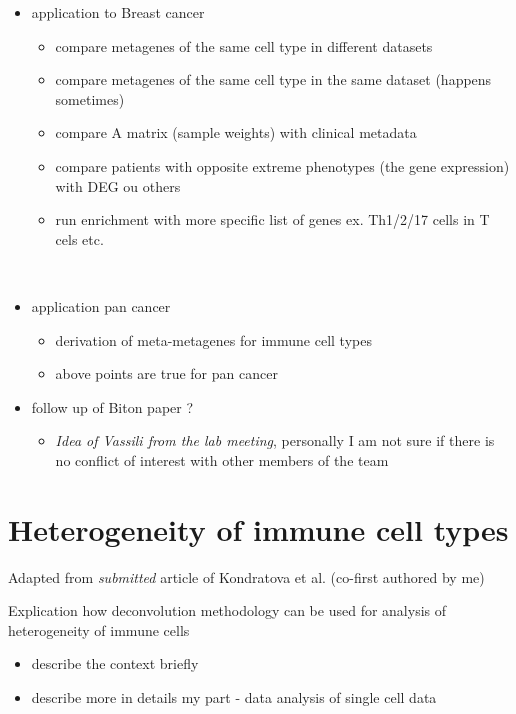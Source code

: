 \documentclass[12pt,]{book}
\providecommand{\tightlist}{%
  \setlength{\itemsep}{0pt}\setlength{\parskip}{0pt}}
\theoremstyle{definition}
\theoremstyle{definition}
\theoremstyle{definition}
\theoremstyle{remark}
\begin{document}
\begin{itemize}
\item
  application to Breast cancer

  \begin{itemize}
  \item
    compare metagenes of the same cell type in different datasets
  \item
    compare metagenes of the same cell type in the same dataset (happens
    sometimes)
  \item
    compare A matrix (sample weights) with clinical metadata
  \item
    compare patients with opposite extreme phenotypes (the gene
    expression) with DEG ou others
  \item
    run enrichment with more specific list of genes ex. Th1/2/17 cells
    in T cels etc.

    ​
  \end{itemize}
\item
  application pan cancer

  \begin{itemize}
  \tightlist
  \item
    derivation of meta-metagenes for immune cell types
  \item
    above points are true for pan cancer
  \end{itemize}
\item
  follow up of Biton paper ?

  \begin{itemize}
  \tightlist
  \item
    \emph{Idea of Vassili from the lab meeting}, personally I am not
    sure if there is no conflict of interest with other members of the
    team
  \end{itemize}
\end{itemize}

\hypertarget{map}{%
\chapter{Heterogeneity of immune cell types}\label{map}}

Adapted from \emph{submitted} article of Kondratova et al. (co-first
authored by me)

Explication how deconvolution methodology can be used for analysis of
heterogeneity of immune cells

\begin{itemize}
\item
  describe the context briefly
\item
  describe more in details my part - data analysis of single cell data
\end{itemize}
\end{document}
